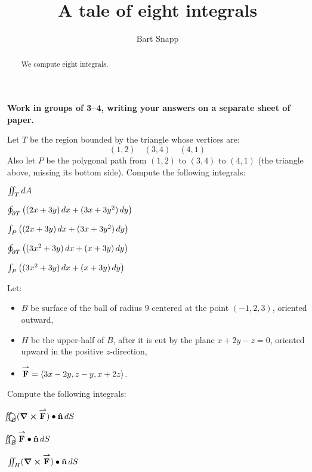 \documentclass[nooutcomes,noauthor]{ximera}
\author{Bart Snapp}
\title[Collaborate:]{A tale of eight integrals}
\begin{document}
\begin{abstract}
  We compute eight integrals.
\end{abstract}
\maketitle

\textbf{Work in groups of 3--4, writing your answers on a separate
  sheet of paper.}

Let $T$ be the region bounded by the triangle whose vertices are:
\[
(1,2)\quad (3,4)\quad (4,1)
\]
Also let $P$ be the polygonal path from $(1,2)$ to $(3,4)$ to $(4,1)$
(the triangle above, missing its bottom side).  Compute the following
integrals:
\begin{problem}
  $\iint_T \mathop{}\!d A$
\end{problem}

\begin{problem}
  $\oint_{\partial T} \left((2x+3y)\mathop{}\!d x + (3x+3y^2)\mathop{}\!d y\right)$
\end{problem}

\begin{problem}
  $\int_P \left((2x+3y)\mathop{}\!d x + (3x+3y^2)\mathop{}\!d y\right)$
\end{problem}

\begin{problem}
  $\oint_{\partial T} \left((3x^2+3y)\mathop{}\!d x + (x+3y)\mathop{}\!d y\right)$
\end{problem}

\begin{problem}
  $\int_P \left((3x^2+3y)\mathop{}\!d x + (x+3y)\mathop{}\!d y\right)$
\end{problem}

\newpage

Let:\vfil
\begin{itemize}[noitemsep,topsep=0pt]
\item $B$ be surface of the ball of radius $9$ centered at the point
  $(-1,2,3)$, oriented outward,
\item $H$ be the upper-half of $B$, after it is cut by the plane
  $x+2y-z =0$, oriented upward in the positive $z$-direction,
\item ${\overset{\boldsymbol{\rightharpoonup}}{\mathbf{F}}} = \left\langle 3x-2y,z-y,x+2z\right\rangle$.
\end{itemize}
Compute the following integrals:
\begin{problem}
  ${\large\bigcirc}\kern-1.56em\iint_B (\boldsymbol\nabla\boldsymbol\times{\overset{\boldsymbol{\rightharpoonup}}{\mathbf{F}}})\bullet\mathbf{\hat{n}}\mathop{}\!d S$
\end{problem}

\begin{problem}  
  ${\large\bigcirc}\kern-1.56em\iint_B {\overset{\boldsymbol{\rightharpoonup}}{\mathbf{F}}}\bullet\mathbf{\hat{n}}\mathop{}\!d S$
\end{problem}

\begin{problem}
  $\iint_H (\boldsymbol\nabla\boldsymbol\times{\overset{\boldsymbol{\rightharpoonup}}{\mathbf{F}}})\bullet\mathbf{\hat{n}}\mathop{}\!d S$
\end{problem}



\vfill
\end{document}
